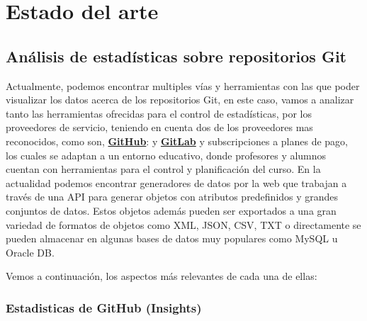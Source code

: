 \chapter{Estado del arte\label{02estadoArte}}

\section{Análisis de estadísticas sobre repositorios Git}

Actualmente, podemos encontrar multiples vías y herramientas con las que
poder visualizar los datos acerca de los repositorios Git, en este caso,
vamos a analizar tanto las herramientas ofrecidas para el control de
estadísticas, por los proveedores de servicio, teniendo en cuenta dos de
los proveedores mas reconocidos, como son,
\textbf{\href{https://github.com/}{GitHub}}: y
\textbf{\href{https://gitlab.com/}{GitLab}} y subscripciones a planes de
pago, los cuales se adaptan a un entorno educativo, donde profesores y
alumnos cuentan con herramientas para el control y planificación del curso.
En la actualidad podemos encontrar generadores de datos por la web que
trabajan a través de una API para generar objetos con atributos
predefinidos y grandes conjuntos de datos. Estos objetos además pueden ser
exportados a una gran variedad de formatos de objetos como XML, JSON, CSV,
TXT o directamente se pueden almacenar en algunas bases de datos muy
populares como MySQL u Oracle DB.

Vemos a continuación, los aspectos más relevantes de cada una de ellas:

\subsection{Estadisticas de GitHub (Insights)}

